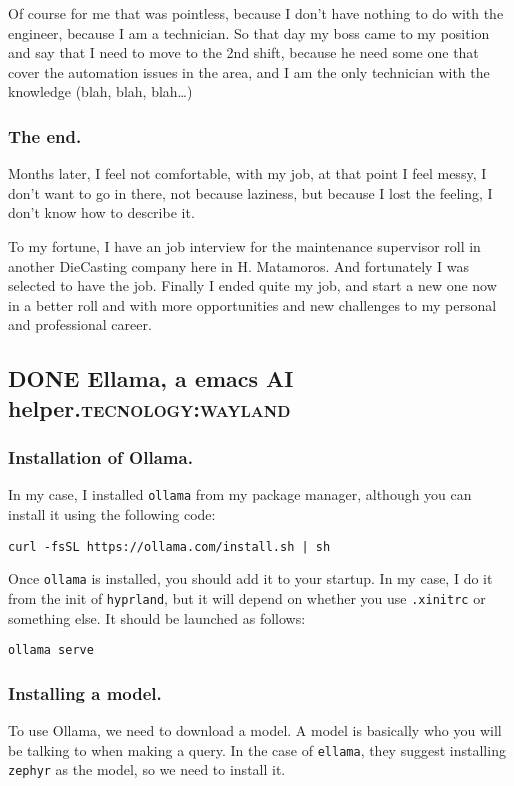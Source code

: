 \documentclass[11pt]{article}
\begin{document}
Of course for me that was pointless, because I don't have nothing  to do with the engineer, because I am a technician. So that day my boss came to my position and say that I need to move to the 2nd shift, because he need some one that cover the automation issues in the area, and I am the only technician with the knowledge (blah, blah, blah\ldots{})
\subsubsection{The end.}
\label{sec:org2d4fd5c}
Months later, I feel not 
comfortable, with my job, at that point I feel messy, I don't want to go in there, not because laziness, but because I lost the feeling, I don't know how to describe it.

To my fortune, I have an job interview for the maintenance supervisor roll in another DieCasting company here in H. Matamoros. And fortunately I was selected to have the job. Finally I ended quite my job, and start a new one now in a better roll and with more opportunities and new challenges to my personal and professional career.
\subsection{{\bfseries\sffamily DONE} Ellama, a emacs AI helper.\hfill{}\textsc{tecnology:wayland}}
\label{sec:org7004c17}
\subsubsection{Installation of Ollama.}
\label{sec:org3da52ce}
In my case, I installed \texttt{ollama} from my package manager, although you can install it using the following code:

\begin{verbatim}
curl -fsSL https://ollama.com/install.sh | sh 
\end{verbatim}

Once \texttt{ollama} is installed, you should add it to your startup. In my case, I do it from the init of \texttt{hyprland}, but it will depend on whether you use \texttt{.xinitrc} or something else. It should be launched as follows:

\begin{verbatim}
ollama serve 
\end{verbatim}
\subsubsection{Installing a model.}
\label{sec:org9eba61b}
To use Ollama, we need to download a model. A model is basically who you will be talking to when making a query. In the case of \texttt{ellama}, they suggest installing \texttt{zephyr} as the model, so we need to install it.
\end{document}
